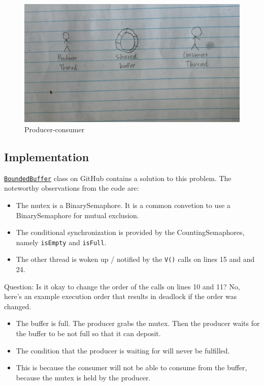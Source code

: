 \documentclass[twoside]{article}
\begin{document}
\begin{figure}
  \includegraphics[width=\linewidth]{img/prodcon.png}
  \caption{Producer-consumer}
\end{figure}

\subsection{Implementation}

\href{https://github.com/vijaygarg1/UT-Garg-EE382C-EE361C-Multicore/blob/master/chapter3-synchronization_primitives/BoundedBuffer.java}{{\tt BoundedBuffer}} class on GitHub contains a solution to this problem. The noteworthy observations from the code are:

\begin{itemize}
    \item The mutex is a BinarySemaphore. It is a common convetion to use a BinarySemaphore for mutual exclusion.
    \item The conditional synchronization is provided by the CountingSemaphores, namely {\tt isEmpty} and {\tt isFull}.
    \item The other thread is woken up / notified by the {\tt V()} calls on lines 15 and and 24.
\end{itemize}

Question: Is it okay to change the order of the calls on lines 10 and 11? No, here's an example execution order that results in deadlock if the order was changed.

\begin{itemize}
    \item The buffer is full. The producer grabs the mutex. Then the producer waits for the buffer to be not full so that it can deposit.
    \item The condition that the producer is waiting for will never be fulfilled.
    \item This is because the consumer will not be able to consume from the buffer, because the mutex is held by the producer.
\end{itemize}
\end{document}
